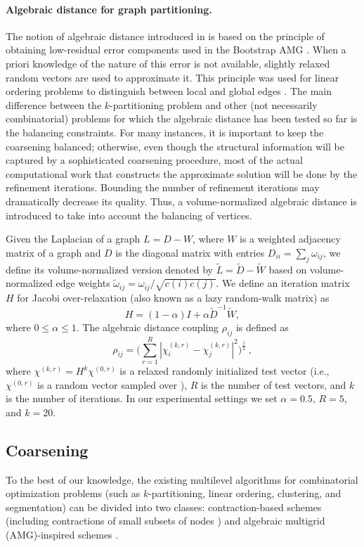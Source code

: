 \documentclass{llncs}
\begin{document}
\paragraph*{Algebraic distance for graph partitioning.} The notion of algebraic distance introduced in \cite{safro:relaxml,chen-safro-algdist-full} is based on the principle of obtaining low-residual error components used in the Bootstrap AMG \cite{bamg-review}. 
When a priori knowledge of the nature of this error is not available, slightly relaxed random vectors are used to approximate it. This principle was used for linear ordering problems to distinguish between local and global edges \cite{safro:relaxml}. The main difference between the $k$-partitioning problem and other (not necessarily combinatorial) problems for which the algebraic distance has been tested so far is the balancing constraints. For many instances, it is important to keep the coarsening balanced; otherwise, even though the structural information will be captured by a sophisticated coarsening procedure, most of the actual computational work that constructs the approximate solution will be done by the refinement iterations. Bounding the number of refinement iterations may dramatically decrease its quality. 
Thus, a volume-normalized algebraic distance is introduced 
to take into account the balancing of vertices. 
\par Given the Laplacian of a graph $L=D-W$, where $W$ is a weighted adjacency matrix of a graph and $D$ is the diagonal matrix with entries $D_{ii}=\sum_j\omega_{ij}$, we define its volume-normalized version denoted by $\tilde{L}=\tilde{D}-\tilde{W}$ based on volume-normalized edge weights $\tilde{\omega}_{ij} = \omega_{ij}/\sqrt{c(i)c(j)}$. We define an iteration matrix $H$ for Jacobi over-relaxation (also known as a lazy random-walk matrix) as
\[
 H = (1-\alpha)I + \alpha \tilde{D}^{-1}\tilde{W},
\]
where $0\leq \alpha \leq 1$. The algebraic distance coupling $\rho_{ij}$ is defined as
\[
\rho_{ij} = \big( \sum_{r=1}^R |\chi_i^{(k,r)} - \chi_j^{(k,r)}|^2 \big)^\frac{1}{2}~,
\]
where $\chi^{(k,r)} = H^k \chi^{(0,r)}$ is a relaxed randomly initialized test vector (i.e., $\chi^{(0,r)}$ is a random vector sampled over \text{[-1/2, 1/2]}), $R$ is the number of test vectors, and $k$ is the number of iterations. In our experimental settings we set $\alpha=0.5$, $R=5$, and $k=20$.

\subsection{Coarsening}
\par To the best of our knowledge, the existing multilevel algorithms for combinatorial optimization problems (such as $k$-partitioning, linear ordering, clustering, and segmentation) can be divided into two classes: contraction-based schemes \cite{kaffpa,Dhillon05afast,KarypisK95} (including contractions of small subsets of nodes \cite{BartelGKM10}) and algebraic multigrid (AMG)-inspired schemes \cite{safro:relaxml,Hu:wavefront,sharon,doritpart}.
\end{document}
